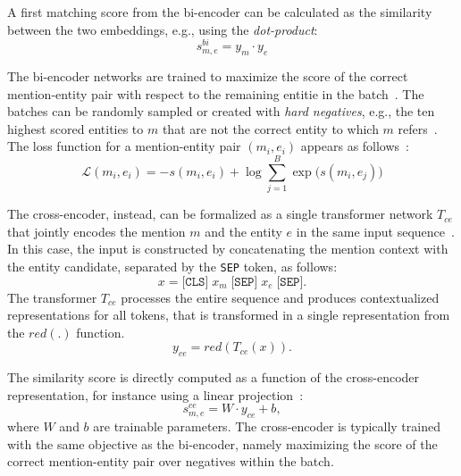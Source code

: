A first matching score from the bi-encoder can be calculated as the similarity between the two embeddings, e.g., using the \emph{dot-product}:
\begin{equation}
s^{bi}_{m,e} = y_m \cdot y_e
\end{equation}

The bi-encoder networks are trained to maximize the score of the correct mention-entity pair with respect to the remaining entitie in the batch~\cite{blink}. The batches can be randomly sampled or created with \emph{hard negatives}, e.g., the ten highest scored entities to $m$ that are not the correct entity to which $m$ refers~\cite{blink}. The loss function for a mention-entity pair $(m_i, e_i)$ appears as follows~\cite{blink}:
\begin{equation}
\mathcal{L}(m_i, e_i) = -s(m_i, e_i) + \log \sum_{j=1}^{B} \exp \big( s(m_i, e_j) \big)
\end{equation}


The cross-encoder, instead, can be formalized as a single transformer network $T_{ce}$ that jointly encodes the mention $m$ and the entity $e$ in the same input sequence~\cite{blink,Humeau2020Poly-encoders,logeswaran-etal-2019-zero}. 
In this case, the input is constructed by concatenating the mention context with the entity candidate, separated by the \texttt{SEP} token, as follows:
\begin{equation}
    x = \texttt{[CLS]} \; x_m \; \texttt{[SEP]} \; x_e \; \texttt{[SEP]}.
\end{equation}
The transformer $T_{ce}$ processes the entire sequence and produces contextualized representations for all tokens, that is transformed in a single representation from the $red(.)$ function.
\begin{equation}
    y_{ce} = red(T_{ce}(x)).
\end{equation}


The similarity score is directly computed as a function of the cross-encoder representation, for instance using a linear projection~\cite{blink}:
\begin{equation}
    s^{ce}_{m,e} = W \cdot y_{ce} + b,
\end{equation}
where $W$ and $b$ are trainable parameters. 
The cross-encoder is typically trained with the same objective as the bi-encoder, namely maximizing the score of the correct mention-entity pair over negatives within the batch.




